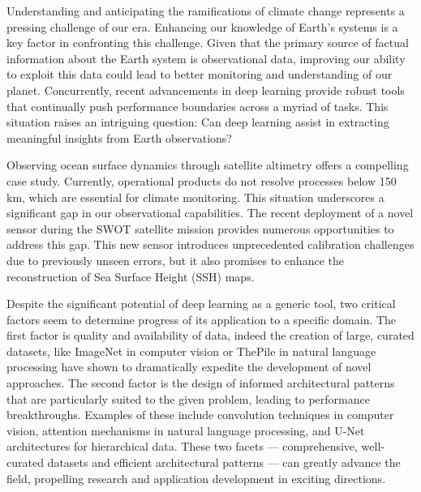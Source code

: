 \begin{bibunit}

Understanding and anticipating the ramifications of climate change represents a pressing challenge of our era. Enhancing our knowledge of Earth's systems is a key factor in confronting this challenge.
  Given that the primary source of factual information about the Earth system is observational data, improving our ability to exploit this data could lead to better monitoring and understanding of our planet.
  Concurrently, recent advancements in deep learning provide robust tools that continually push performance boundaries across a myriad of tasks. 
  This situation raises an intriguing question: Can deep learning assist in extracting meaningful insights from Earth observations?

Observing ocean surface dynamics through satellite altimetry offers a compelling case study.
  Currently, operational products do not resolve processes below 150 km, which are essential for climate monitoring.
  This situation underscores a significant gap in our observational capabilities.
  The recent deployment of a novel sensor during the SWOT satellite mission provides numerous opportunities to address this gap.
  This new sensor introduces unprecedented calibration challenges due to previously unseen errors, but it also promises to enhance the reconstruction of Sea Surface Height (SSH) maps.

Despite the significant potential of deep learning as a generic tool, two critical factors seem to determine progress of its application to a specific domain. The first factor is quality and availability of data, indeed the creation of large, curated datasets, like ImageNet in computer vision or ThePile in natural language processing have shown to dramatically expedite the development of novel approaches. The second factor is the design of informed architectural patterns that are particularly suited to the given problem, leading to performance breakthroughs. Examples of these include convolution techniques in computer vision, attention mechanisms in natural language processing, and U-Net architectures for hierarchical data. These two facets — comprehensive, well-curated datasets and efficient architectural patterns — can greatly advance the field, propelling research and application development in exciting directions.


\end{bibunit}
